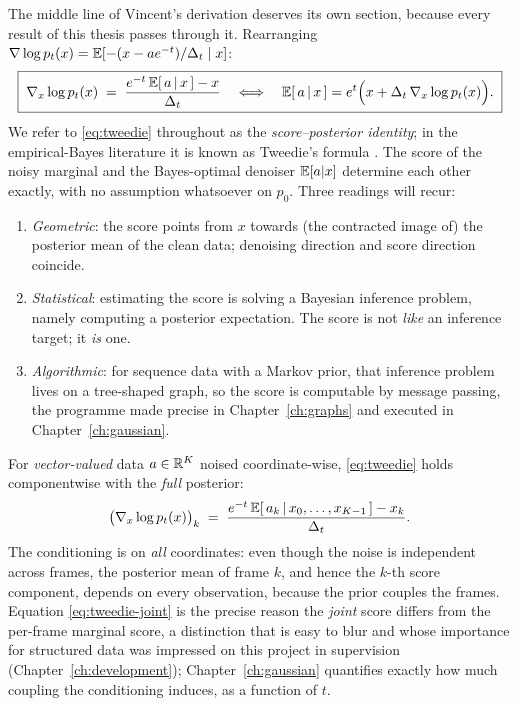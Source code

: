 The middle line of Vincent's derivation deserves its own section,
because every result of this thesis passes through it. Rearranging
$\nabla \log p_t(x) = \mathbb{E}[-(x - a e^{-t})/\Delta_t \mid x]$:
\begin{equation}
  \boxed{\;
  \nabla_x \log p_t(x)
  \;=\; \frac{e^{-t}\,\mathbb{E}[\,a \,|\, x\,] - x}{\Delta_t}
  \quad\Longleftrightarrow\quad
  \mathbb{E}[\,a \,|\, x\,]
  = e^{t} \Big( x + \Delta_t\, \nabla_x \log p_t(x) \Big).
  \;}
  \label{eq:tweedie}
\end{equation}
We refer to \eqref{eq:tweedie} throughout as the \emph{score--posterior
identity}; in the empirical-Bayes literature it is known as Tweedie's
formula \citep{robbins1956empirical, miyasawa1961empirical,
efron2011tweedie}. The score of the noisy marginal and the Bayes-optimal
denoiser $\mathbb{E}[a|x]$ determine each other exactly, with no assumption
whatsoever on $p_0$. Three readings will recur:
\begin{enumerate}
  \item \emph{Geometric}: the score points from $x$ towards (the
  contracted image of) the posterior mean of the clean data; denoising
  direction and score direction coincide.
  \item \emph{Statistical}: estimating the score is solving a Bayesian
  inference problem, namely computing a posterior expectation. The score
  is not \emph{like} an inference target; it \emph{is} one.
  \item \emph{Algorithmic}: for sequence data with a Markov prior, that
  inference problem lives on a tree-shaped graph, so the score is
  computable by message passing, the programme made precise in
  Chapter~\ref{ch:graphs} and executed in Chapter~\ref{ch:gaussian}.
\end{enumerate}

For \emph{vector-valued} data $a \in \mathbb{R}^K$ noised coordinate-wise,
\eqref{eq:tweedie} holds componentwise with the \emph{full} posterior:
\begin{equation}
  \big( \nabla_x \log p_t(x) \big)_k
  \;=\; \frac{e^{-t}\, \mathbb{E}[\,a_k \,|\, x_0, \dots, x_{K-1}\,] - x_k}{\Delta_t}.
  \label{eq:tweedie-joint}
\end{equation}
The conditioning is on \emph{all} coordinates: even though the noise is
independent across frames, the posterior mean of frame $k$, and hence the
$k$-th score component, depends on every observation, because the prior
couples the frames. Equation \eqref{eq:tweedie-joint} is the precise
reason the \emph{joint} score differs from the per-frame marginal score,
a distinction that is easy to blur and whose importance for structured
data was impressed on this project in supervision
(Chapter~\ref{ch:development}); Chapter~\ref{ch:gaussian} quantifies
exactly how much coupling the conditioning induces, as a function of $t$.

